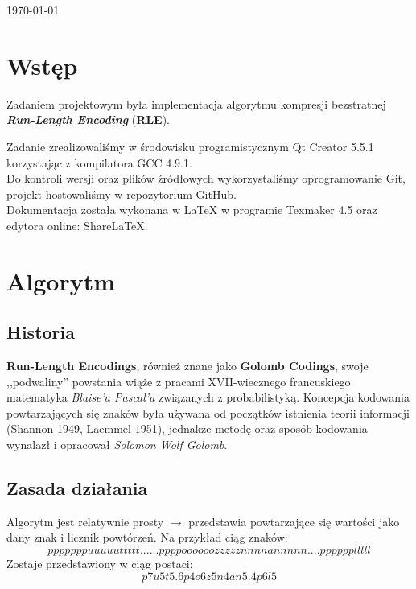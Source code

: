 \documentclass[12pt,a4paper,notitlepage]{report}
\makeatletter
\newcommand*{\toccontents}{\@starttoc{toc}}
\makeatother
\begin{document}
\begin{titlepage}
\begin{center}
\vspace{2cm}
{\large \today}

\end{center}
\end{titlepage}

\toccontents

\section{Wstęp}
Zadaniem projektowym była implementacja algorytmu kompresji bezstratnej \newline \emph{\textbf{Run-Length Encoding}} (\textbf{RLE}).

Zadanie zrealizowaliśmy w środowisku programistycznym Qt Creator 5.5.1\cite{qt} korzystając z kompilatora GCC 4.9.1\cite{gcc}.\\
Do kontroli wersji oraz plików źródłowych wykorzystaliśmy oprogramowanie Git\cite{git}, projekt hostowaliśmy w repozytorium GitHub\cite{github}.\\
Dokumentacja została wykonana w \LaTeX \cite{latex} w programie Texmaker 4.5 \cite{program} oraz edytora online: ShareLaTeX\cite{sharelatex}. 

\section{Algorytm}
\subsection{Historia}
\textbf{Run-Length Encodings}, również znane jako \textbf{Golomb Codings}, swoje ,,podwaliny'' powstania wiąże z pracami XVII-wiecznego francuskiego matematyka \textit{Blaise'a Pascal'a} związanych z probabilistyką\cite{book}. Koncepcja kodowania powtarzających się znaków była używana od początków istnienia teorii informacji (Shannon 1949, Laemmel 1951), jednakże metodę oraz sposób kodowania wynalazł i opracował \textit{Solomon Wolf Golomb}\cite{golomb}.

\subsection{Zasada działania}
Algorytm jest relatywnie prosty $\rightarrow$ przedstawia powtarzające się wartości jako dany znak i licznik powtórzeń. Na przykład ciąg znaków:
\[pppppppuuuuuttttt......ppppoooooozzzzznnnnannnnn....pppppplllll\]
Zostaje przedstawiony w ciąg postaci:
\[p7u5t5.6p4o6z5n4an5.4p6l5\]
\end{document}
